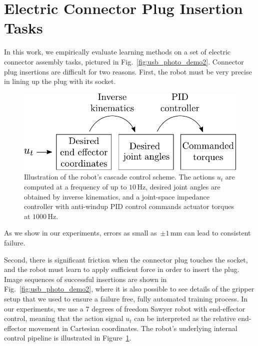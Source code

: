 \section{Electric Connector Plug Insertion Tasks}

In this work, we empirically evaluate learning methods on a set of electric connector assembly tasks, pictured in Fig.~\ref{fig:usb_photo_demo2}.
Connector plug insertions are difficult for two reasons. 
First, the robot must be very precise in lining up the plug with its socket. 
\begin{figure}
  \begin{center}
        \includegraphics[width=0.88\linewidth]{insertion/newfigs/control_pipeline.pdf}
        \captionsetup{justification=justified, format=plain}
    \caption{Illustration of the robot's cascade control scheme. The actions  $u_t$ are computed at a frequency of up to $10\,\mathrm{Hz}$,  desired joint angles are obtained by inverse kinematics, and a joint-space impedance controller with anti-windup PID control commands actuator torques at $1000\,\mathrm{Hz}$.}
   \label{fig:control_pipeline}
  \end{center}
\end{figure}
As we show in our experiments, errors as small as~$\pm 1$\,mm can lead to consistent failure. 

Second, there is significant friction when the connector plug touches the socket, and the robot must learn to apply sufficient force in order to insert the plug. Image sequences of successful insertions are shown in Fig.~\ref{fig:usb_photo_demo2}, where it is also possible to see details of the gripper setup that we used to ensure a failure free, fully automated training process.
In our experiments, we use a 7 degrees of freedom Sawyer robot with end-effector control, meaning that the action signal $u_t$ can be interpreted as the relative end-effector movement in Cartesian coordinates. The robot's underlying internal control pipeline is illustrated in Figure~\ref{fig:control_pipeline}.

